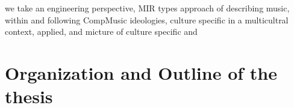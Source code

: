








we take an engineering perspective, MIR types approach of describing music, within and following CompMusic ideologies, culture specific in a multicultral context, applied, and micture of culture specific and 



\section{Organization and Outline of the thesis}
\label{sec:intro_organization}
